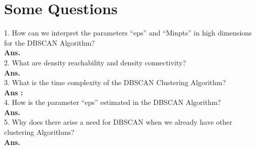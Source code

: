 \documentclass[a4paper, 11pt]{article}
\begin{document}



\section{Some Questions}
1. How can we interpret the parameters “eps” and “Minpts” in high dimensions for the DBSCAN Algorithm? \\
\textbf{Ans.}  \\
2. What are density reachability and density connectivity?  \\
\textbf{Ans.} \\
3. What is the time complexity of the DBSCAN Clustering Algorithm?\\ 
\textbf{Ans :} \\
4. How is the parameter “eps” estimated in the DBSCAN Algorithm? \\
\textbf{Ans.}
\\
5. Why does there arise a need for DBSCAN when we already have other clustering Algorithms?
\\ \textbf{Ans. } \\


\end{document}
